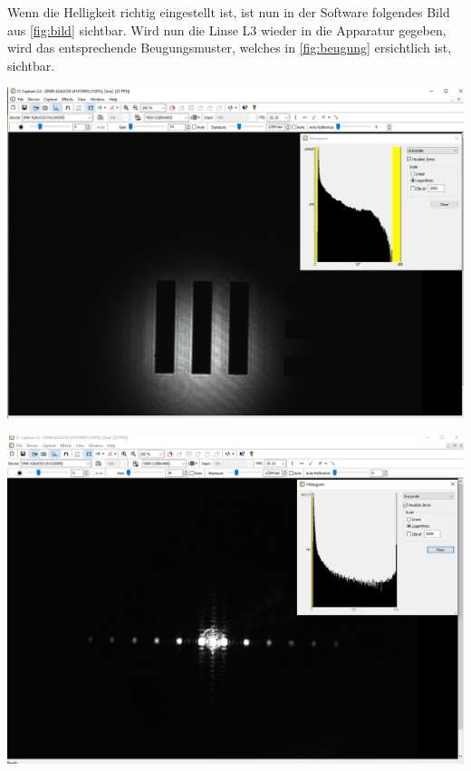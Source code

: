 \documentclass[11pt,ngerman]{scrartcl}
\begin{document}
\noindent Wenn die Helligkeit richtig eingestellt ist, ist nun in der Software folgendes Bild aus \autoref{fig:bild} sichtbar. Wird nun die Linse L3 wieder in die Apparatur gegeben, wird das entsprechende Beugungsmuster, welches in \autoref{fig:beugung} ersichtlich ist, sichtbar.

\begin{minipage}{\textwidth}
	\begin{minipage}[t]{0.5\textwidth}
		\centering
		\includegraphics[width=\textwidth]{./abbe/objekt}
		\label{fig:bild}
	\end{minipage}
	\vspace{2mm}
	\begin{minipage}[t]{0.50\textwidth}
		\centering
		\includegraphics[width=\textwidth]{./abbe/beugungsbildalle}
		\label{fig:beugung}
	\end{minipage}
	\vspace{1em}
\end{minipage}
\end{document}
